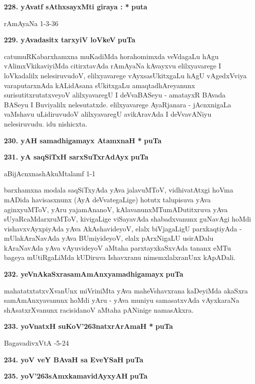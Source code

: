 \medskip
\noindent
\textbf{228. yAvatf sAthxsayxMti giraya : *} \hfill{\bf puta \pageref{77a}}

\hfill{rAmAyaNa 1-3-36}

\medskip
\noindent
\textbf{229. yAvadasitx tarxyiV loVkeV} \hfill{\bf puTa \pageref{20c}}

\smallskip
catumuRKabarxhamxna muKadiMda horahomimxda veVdagaLu hAgu vAlimxVkikaviyiMda citirxtavAda rAmAyaNa kAvayxvu elilxyavarege I loVkadalilx nelesiruvudoV, elilxyavarege vAyxsasUkitxgaLu hAgU vAgedxVviya varaputarxnAda kALidAsana sUkitxgaLu amaqtadhAreyanunx surisutitxrutatxveyoV alilxyavaregU I deVvaBASeyu - amatayxR BAvada BASeyu I Buviyalilx nelesutatxde. elilxyavarege AyaRjanara - jAcnxnigaLa vaMshavu uLidiruvudoV alilxyavaregU avikAravAda I deVvavANiyu nelesiruvudu. idu nishicxta.

\medskip
\noindent
\textbf{230. yAH samadhigamayx AtamxnaH *} \hfill{\bf puTa \pageref{94f}}

\medskip
\noindent
\textbf{231. yA saqSiTxH sarxSuTxrAdAyx} \hfill{\bf puTa \pageref{243}}

\hfill{aBijAcnxnashAkuMtalamf 1-1}

\smallskip
barxhamxna modala saqSiTxyAda yAva jalavuMToV, vidhivatAtxgi hoVma \hbox{mADida} havisasxnunx (AyA deVvategaLige) hotutx talupisuva yAva aginxyuMToV, yAru yajamAnanoV, kAlavanunxMTumADutitxruva yAva sUyaRcaMdarxruMToV, kivigaLige viSayavAda shabadxvanunx guNavAgi hoMdi vishavxvAyxpiyAda yAva AkAshavideyoV, elalx biVjagaLigU parxkaqtiyAda - mUlakAraNavAda yAva BUmiyideyoV, elalx pArxNigaLU usirADalu kAraNavAda yAva vAyuvideyoV aMtaha parxtayxkaSxvAda tananx eMTu bageya mUtiRgaLiMda kUDiruva Ishavxranu nimemxlalxranUnx kApADali.

\medskip
\noindent
\textbf{232. yeVnAkaSxrasamAmAnxyamadhigamayx} \hfill{\bf puTa \pageref{157}}

\smallskip
mahatatxtatxvXvanUnx miVriniMta yAva maheVshavxrana kaDeyiMda akaSxra samAmAnxyavanunx hoMdi yAru - yAva muniyu samasatxvAda vAyxkaraNa shAsatxrXvanunx racisidanoV aMtaha pANinige namasAkxra.

\medskip
\noindent
\textbf{233. yoVnatxH suKoV\char'263natxrArAmaH *} \hfill{\bf puTa \pageref{134}}

\hfill{BagavadivxVtA -5-24}

\medskip
\noindent
\textbf{234. yoV veY BAvaH sa EveYSaH} \hfill{\bf puTa \pageref{227}}

\medskip
\noindent
\textbf{235. yoV\char'263sAmxkamavidAyxyAH} \hfill{\bf puTa \pageref{103c}}

